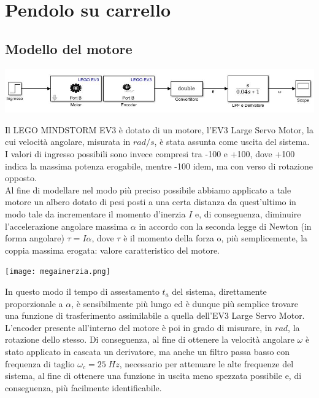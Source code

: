 \chapter{Pendolo su carrello}
\section{Modello del motore}
\begin{center}
	\includegraphics[width=\textwidth]{motoreSimulink.jpg}
\end{center}
Il LEGO MINDSTORM EV3 è dotato di un motore, l'EV3 Large Servo Motor, la cui velocità angolare, misurata in $rad/s$, è stata assunta come uscita del sistema.\\
I valori di ingresso possibili sono invece compresi tra -100 e +100, dove +100 indica la massima potenza erogabile, mentre -100 idem, ma con verso di rotazione opposto.\\
Al fine di modellare nel modo più preciso possibile abbiamo applicato a tale motore un albero dotato di pesi posti a una certa distanza da quest'ultimo in modo tale da incrementare il momento d'inerzia $I$ e, di conseguenza, diminuire l'accelerazione angolare massima $\alpha$ in accordo con la seconda legge di Newton (in forma angolare) $\tau = I\alpha$, dove $\tau$ è il momento della forza o, più semplicemente, la coppia massima erogata: valore caratteristico del motore.
\begin{center}
	\texttt{[image: megainerzia.png]}
\end{center}
In questo modo il tempo di assestamento $t_a$ del sistema, direttamente proporzionale a $\alpha$, è sensibilmente più lungo ed è dunque più semplice trovare una funzione di trasferimento assimilabile a quella dell'EV3 Large Servo Motor.\\
L'encoder presente all'interno del motore è poi in grado di misurare, in $rad$, la rotazione dello stesso.
Di conseguenza, al fine di ottenere la velocità angolare $\omega$ è stato applicato in cascata un derivatore, ma anche un filtro passa basso con frequenza di taglio $\omega_c=25\;Hz$, necessario per attenuare le alte frequenze del sistema, al fine di ottenere una funzione in uscita meno spezzata possibile e, di conseguenza, più facilmente identificabile.\\
